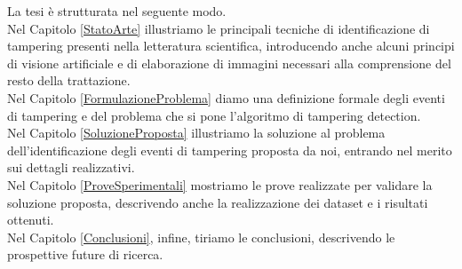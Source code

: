 

\noindent La tesi \`e strutturata nel seguente modo.\\
Nel Capitolo \ref{StatoArte} illustriamo le principali tecniche di identificazione di tampering presenti nella letteratura scientifica, introducendo anche alcuni principi di visione artificiale e di elaborazione di immagini necessari alla comprensione del resto della trattazione.\\
Nel Capitolo \ref{FormulazioneProblema} diamo una definizione formale degli eventi di tampering e del problema che si pone l'algoritmo di tampering detection.\\
Nel Capitolo \ref{SoluzioneProposta} illustriamo la soluzione al problema dell'identificazione degli eventi di tampering proposta da noi, entrando nel merito sui dettagli realizzativi.\\
Nel Capitolo \ref{ProveSperimentali} mostriamo le prove realizzate per validare la soluzione proposta, descrivendo anche la realizzazione dei dataset e i risultati ottenuti.\\
Nel Capitolo \ref{Conclusioni}, infine, tiriamo le conclusioni, descrivendo le prospettive future di ricerca.
	
